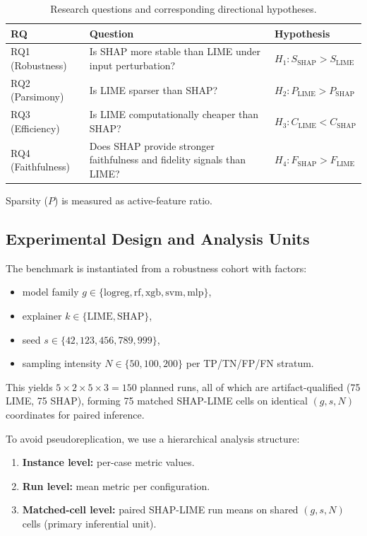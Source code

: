 \documentclass[10pt]{article}
\begin{document}
\begin{table}[h]
\centering
\caption{Research questions and corresponding directional hypotheses.}
\label{tab:rqs}
\begin{tabularx}{\linewidth}{p{2.1cm} X l}
\toprule
\textbf{RQ} & \textbf{Question} & \textbf{Hypothesis} \\
\midrule
RQ1 (Robustness) & Is SHAP more stable than LIME under input perturbation? & $H_1: S_{\mathrm{SHAP}} > S_{\mathrm{LIME}}$ \\
RQ2 (Parsimony) & Is LIME sparser than SHAP? & $H_2: P_{\mathrm{LIME}} > P_{\mathrm{SHAP}}$ \\
RQ3 (Efficiency) & Is LIME computationally cheaper than SHAP? & $H_3: C_{\mathrm{LIME}} < C_{\mathrm{SHAP}}$ \\
RQ4 (Faithfulness) & Does SHAP provide stronger faithfulness and fidelity signals than LIME? & $H_4: F_{\mathrm{SHAP}} > F_{\mathrm{LIME}}$ \\
\bottomrule
\end{tabularx}
\end{table}
Sparsity ($P$) is measured as active-feature ratio.

\subsection{Experimental Design and Analysis Units}
\label{sec:design}

The benchmark is instantiated from a robustness cohort with factors:
\begin{itemize}[leftmargin=*]
\item model family $g \in \{\mathrm{logreg}, \mathrm{rf}, \mathrm{xgb},
\mathrm{svm}, \mathrm{mlp}\}$,
\item explainer $k \in \{\mathrm{LIME}, \mathrm{SHAP}\}$,
\item seed $s \in \{42, 123, 456, 789, 999\}$,
\item sampling intensity $N \in \{50, 100, 200\}$ per TP/TN/FP/FN stratum.
\end{itemize}

This yields $5 \times 2 \times 5 \times 3 = 150$ planned runs, all of
which are artifact-qualified (75 LIME, 75 SHAP), forming 75 matched
SHAP-LIME cells on identical $(g, s, N)$ coordinates for paired inference.

To avoid pseudoreplication, we use a hierarchical analysis structure:
\begin{enumerate}[leftmargin=*]
\item \textbf{Instance level:} per-case metric values.
\item \textbf{Run level:} mean metric per configuration.
\item \textbf{Matched-cell level:} paired SHAP-LIME run means on shared
$(g, s, N)$ cells (primary inferential unit).
\end{enumerate}
\end{document}
